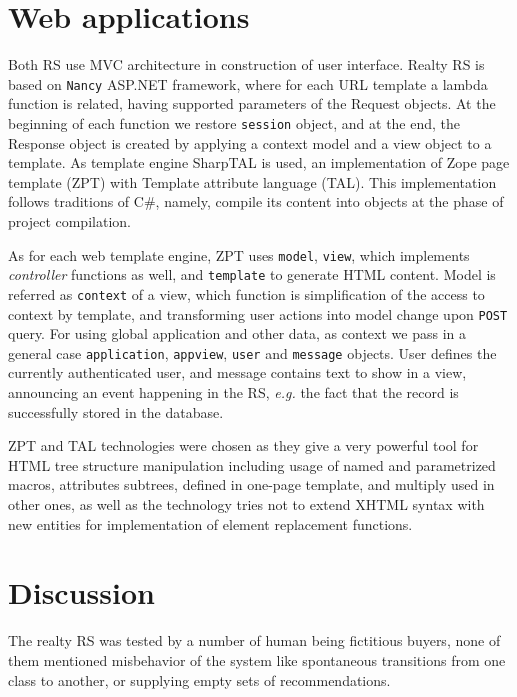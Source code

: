 \documentclass[conference]{IEEEtran}
\begin{document}
\section{Web applications}

Both RS use MVC \cite{friman15,cchadvik20} architecture in construction of user interface.  Realty RS is based on \texttt{Nancy} ASP.NET framework, where for each URL template a lambda function is related, having supported parameters of the Request objects.  At the beginning of each function we restore \texttt{session} object, and at the end, the Response object is created by applying a context model and a view object to a template.  As template engine SharpTAL is used, an implementation of Zope page template (ZPT) with Template attribute language (TAL).  This implementation follows traditions of C\#, namely, compile its content into objects at the phase of project compilation.

As for each web template engine, ZPT uses \texttt{model}, \texttt{view}, which implements \emph{controller} functions as well, and \texttt{template} to generate HTML content.  Model is referred as \texttt{context} of a view, which function is simplification of the access to context by template, and transforming user actions into model change upon \texttt{POST} query.  For using global application and other data, as context we pass in a general case \texttt{application}, \texttt{appview}, \texttt{user} and \texttt{message} objects.  User defines the currently authenticated user, and message contains text to show in a view, announcing an event happening in the RS, \emph{e.g.} the fact that the record is successfully stored in the database.

ZPT and TAL technologies were chosen as they give a very powerful tool for HTML tree structure manipulation including usage of named and parametrized macros, attributes subtrees, defined in one-page template, and multiply used in other ones, as well as the technology tries not to extend XHTML syntax with new entities for implementation of element replacement functions.

\section{Discussion}
\label{sec:disc}

The realty RS was tested by a number of human being fictitious buyers, none of them mentioned misbehavior of the system like spontaneous transitions from one class to another, or supplying empty sets of recommendations.
\end{document}

